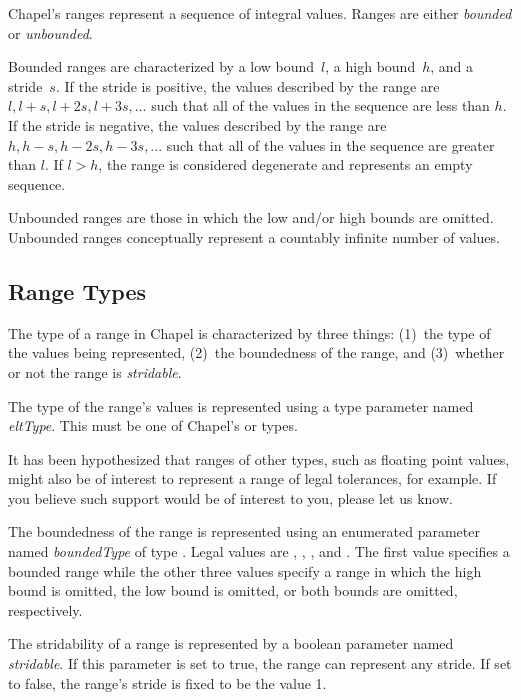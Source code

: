\label{Ranges}

Chapel's ranges represent a sequence of integral values.  Ranges are
either \emph{bounded} or \emph{unbounded}.

Bounded ranges are characterized by a low bound~$l$, a high bound~$h$,
and a stride~$s$.  If the stride is positive, the values described by
the range are $l, l+s, l+2s, l+3s, ...$ such that all of the values in
the sequence are less than $h$.  If the stride is negative, the values
described by the range are $h, h-s, h-2s, h-3s, ...$ such that all of
the values in the sequence are greater than $l$.  If $l > h$, the
range is considered degenerate and represents an empty sequence.

Unbounded ranges are those in which the low and/or high bounds are
omitted.  Unbounded ranges conceptually represent a countably infinite
number of values.

\subsection{Range Types}
\label{Range_Types}

The type of a range in Chapel is characterized by three things:
(1)~the type of the values being represented, (2)~the boundedness of
the range, and (3)~whether or not the range is \emph{stridable}.

The type of the range's values is represented using a type parameter
named \emph{eltType}.  This must be one of Chapel's  or
 types.

\begin{openissue}
It has been hypothesized that ranges of other types, such as floating
point values, might also be of interest to represent a range of legal
tolerances, for example.  If you believe such support would be of
interest to you, please let us know.
\end{openissue}

The boundedness of the range is represented using an enumerated
parameter named \emph{boundedType} of type .
Legal values are , ,
, and .  The first value specifies
a bounded range while the other three values specify a range in which
the high bound is omitted, the low bound is omitted, or both bounds
are omitted, respectively.

The stridability of a range is represented by a boolean parameter
named \emph{stridable}.  If this parameter is set to true, the range
can represent any stride.  If set to false, the range's stride is
fixed to be the value 1.


